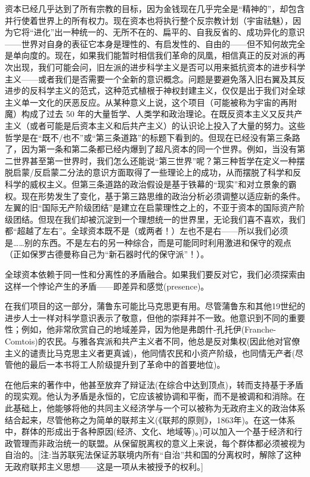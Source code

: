 \documentclass[DIV=12,%
               BCOR=0mm,%
               headinclude=false,%
               footinclude=false,open=any,%
               fontsize=10pt,%
               oneside,%
               paper=210mm:11in]%
               {scrbook}
\newcommand*{\Slash}{\slash\hspace{0pt}}
\begin{document}
资本已经几乎达到了所有宗教的目标，因为金钱现在几乎完全是“精神的”，却包含并行使着世界上的所有权力。现在资本也将执行整个反宗教计划（宇宙祛魅），因为它将“进化”出一种统一的、无所不在的、扁平的、自我反省的、成功异化的意识——世界对自身的表征它本身是理性的、有启发性的、自由的——但不知何故完全是单向度的。现在，如果我们能暂时相信我们革命的凤凰，相信真正的反对派的再次出现，我们可能会问，旧左派的进步科学主义是否可以用来抵抗资本的进步科学主义——或者我们是否需要一个全新的意识概念。问题是要避免落入旧右翼及其反进步的反科学主义的范式，这种范式植根于神权封建主义，仅仅是出于我们对全球主义单一文化的厌恶反应。从某种意义上说，这个项目（可能被称为宇宙的再附魔）构成了过去 50 年的大量哲学、人类学和政治理论。在既反资本主义又反共产主义（或者可能是后资本主义和后共产主义）的认识论上投入了大量的努力。这些哲学是在“既不\Slash{}也不”或“第三条道路”的标题下看到的。但现在已经没有第三条路了，因为第一条和第二条都已经内爆到了超凡资本的同一个世界。例如，当没有第二世界甚至第一世界时，我们怎么还能说“第三世界”呢？第三种哲学在定义一种摆脱启蒙\Slash{}反启蒙二分法的意识方面取得了一些理论上的成功，从而摆脱了科学和反科学的威权主义。但第三条道路的政治假设是基于铁幕的“现实”和对立景象的霸权。现在形势发生了变化，基于第三路思维的政治分析必须调整以适应新的条件。左翼的旧“国际无产阶级团结”是建立在启蒙理性之上的，不亚于资本的国际资产阶级团结。但现在我们却被沉淀到一个理想统一的世界里，无论我们喜不喜欢，我们都“超越了左右”。全球资本既不是（或两者！）左也不是右——所以我们必须是\dots{}\dots{}别的东西。不是左右的另一种综合，而是可能同时利用激进和保守的观点（正如保罗古德曼称自己为“新石器时代的保守派”！）。


全球资本依赖于同一性和分离性的矛盾融合。如果我们要反对它，我们必须探索由这样一个悖论产生的矛盾——即差异和感觉(presence)。


在我们项目的这一部分，蒲鲁东可能比马克思更有用。尽管蒲鲁东和其他19世纪的进步人士一样对科学意识表示了敬意，但他的崇拜并不一致。他意识到不同的重要性；例如，他非常欣赏自己的地域差异，因为他是弗朗什-孔托伊(Franche-Comtois)的农民。与雅各宾派和共产主义者不同，他总是反对集权(因此他对官僚主义的谴责比马克思主义者更真诚)，他同情农民和小资产阶级，也同情无产者(尽管他的最后一本书将工人阶级提升到了革命中的首要地位)。


在他后来的著作中，他甚至放弃了辩证法(在综合中达到顶点)，转而支持基于矛盾的现实观。他认为矛盾是永恒的，它应该被协调和平衡，而不是被调和和消除。在此基础上，他能够将他的共同主义经济学与一个可以被称为无政府主义的政治体系结合起来，尽管他称之为简单的联邦主义(《联邦的原则》，1863年)。在这一体系中，群体的形成出于各种原因(经济、文化、地域等)。)可以加入一个基于经济和行政管理而非政治统一的联盟。从保留脱离权的意义上来说，每个群体都必须被视为自治的。[注:当苏联宪法保证苏联境内所有“自治”共和国的分离权时，解除了这种无政府联邦主义思想——这是一项从未被授予的权利。]
\end{document}

